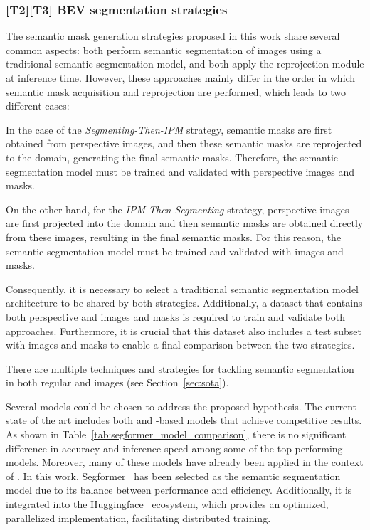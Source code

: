 \subsubsection{[T2][T3] BEV segmentation strategies}
The  semantic mask generation strategies proposed in this work share several common aspects: both perform semantic segmentation of images using a traditional semantic segmentation model, and both apply the  reprojection module at inference time. However, these approaches mainly differ in the order in which semantic mask acquisition and reprojection are performed, which leads to two different cases:

In the case of the \textit{Segmenting-Then-IPM} strategy, semantic masks are first obtained from perspective images, and then these semantic masks are reprojected to the  domain, generating the final  semantic masks. Therefore, the semantic segmentation model must be trained and validated with perspective images and masks.

On the other hand, for the \textit{IPM-Then-Segmenting} strategy, perspective images are first projected into the  domain and then semantic masks are obtained directly from these  images, resulting in the final  semantic masks. For this reason, the semantic segmentation model must be trained and validated with  images and masks.

Consequently, it is necessary to select a traditional semantic segmentation model architecture to be shared by both strategies. Additionally, a dataset that contains both perspective and  images and masks is required to train and validate both approaches. Furthermore, it is crucial that this dataset also includes a test subset with  images and masks to enable a final comparison between the two strategies.

There are multiple techniques and strategies for tackling semantic segmentation in both regular and  images (see Section~\ref{sec:sota}).  

Several models could be chosen to address the proposed hypothesis. The current state of the art includes both  and -based models that achieve competitive results. As shown in Table~\ref{tab:segformer_model_comparison}, there is no significant difference in accuracy and inference speed among some of the top-performing models. Moreover, many of these models have already been applied in the context of . In this work, Segformer~\cite{segformer} has been selected as the semantic segmentation model due to its balance between performance and efficiency. Additionally, it is integrated into the Huggingface~\cite{huggingface} ecosystem, which provides an optimized, parallelized implementation, facilitating distributed training.  


